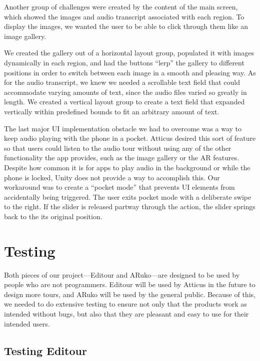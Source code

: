 \documentclass[a4paper, 10pt, american, titlepage]{article}
\begin{document}
Another group of challenges were created by the content of the main screen,
which showed the images and audio transcript associated with each region. To
display the images, we wanted the user to be able to click through them like
an image gallery.

We created the gallery out of a horizontal layout group, populated it with
images dynamically in each region, and had the buttons ``lerp'' the gallery
to different positions in order to switch between each image in a smooth and
pleasing way. As for the audio transcript, we knew we needed a scrollable text
field that could accommodate varying amounts of text, since the audio files
varied so greatly in length. We created a vertical layout group to create a text
field that expanded vertically within predefined bounds to fit an arbitrary
amount of text.

The last major UI implementation obstacle we had to overcome was a way to keep
audio playing with the phone in a pocket. Atticus desired this sort of feature
so that users could listen to the audio tour without using any of the other
functionality the app provides, such as the image gallery or the AR
features. Despite how common it is for apps to play audio in the background or
while the phone is locked, Unity does not provide a way to accomplish this. Our
workaround was to create a ``pocket mode'' that prevents UI elements from
accidentally being triggered. The user exits pocket mode with a deliberate swipe
to the right. If the slider is released partway through the action, the slider
springs back to the its original position.

\clearpage

\section{Testing}
\label{sec:testing}

Both pieces of our project---Editour and ARuko---are designed to be used by
people who are not programmers. Editour will be used by Atticus in the future to
design more tours, and ARuko will be used by the general public. Because of
this, we needed to do extensive testing to ensure not only that the products
work as intended without bugs, but also that they are pleasant and easy to use
for their intended users.

\subsection{Testing Editour}
\label{sec:testingEditour}
\end{document}
